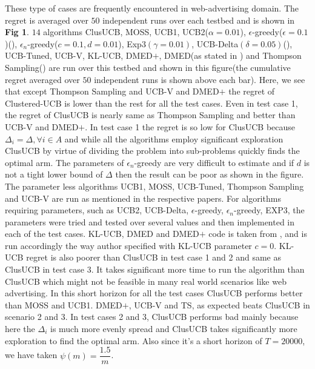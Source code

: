 	These type of cases are frequently encountered in web-advertising domain. The regret is averaged over $50$ independent runs over each testbed and is shown in \textbf{Fig 1}. $14$ algorithms ClusUCB, MOSS, UCB1, UCB2($\alpha=0.01$), $\epsilon$-greedy($\epsilon=0.1$)(\cite{sutton1998reinforcement}), $\epsilon_{n}$-greedy($c=0.1,d=0.01$), Exp3$(\gamma=0.01)$, UCB-Delta$(\delta=0.05)$(\cite{abbasi2011improved}), UCB-Tuned, UCB-V, KL-UCB, DMED$+$, DMED(as stated in \cite{garivier2011kl}) and Thompson Sampling(\cite{agrawal2011analysis}) are run over this testbed and shown in this figure(the cumulative regret averaged over $50$ independent runs is shown above each bar). Here, we see that except Thompson Sampling and UCB-V and DMED$+$ the regret of Clustered-UCB is lower than the rest for all the test cases. Even in test case 1, the regret of ClusUCB is nearly same as Thompson Sampling and better than UCB-V and DMED$+$. In test case 1 the regret is so low for ClusUCB because $\Delta_{i}=\Delta, \forall i\in A$ and while all the algorithms employ significant exploration ClusUCB by virtue of dividing the problem into sub-problems quickly finds the optimal arm. The parameters of $\epsilon_{n}$-greedy are very difficult to estimate and if $d$ is not a tight lower bound of $\Delta$ then the result can be poor as shown in the figure. The parameter less algorithms  UCB1, MOSS, UCB-Tuned, Thompson Sampling and UCB-V are run as mentioned in the respective papers. For algorithms requiring parameters, such as UCB2, UCB-Delta, $\epsilon$-greedy, $\epsilon_{n}$-greedy, EXP3, the parameters were tried and tested over several values and then implemented in each of the test cases. KL-UCB, DMED and DMED$+$ code is taken from \cite{CapGarKau12}, and is run accordingly the way author specified with KL-UCB parameter $c=0$.  KL-UCB regret is also poorer than ClusUCB in test case 1 and 2 and same as ClusUCB in test case 3. It takes significant more time to run the algorithm than ClusUCB which might not be feasible in many real world scenarios like web advertising. In this short horizon for all the test cases ClusUCB 
performs better than MOSS and UCB1. DMED$+$, UCB-V and TS, as expected beats ClusUCB in scenario 2 and 3. In test cases 2 and 3, ClusUCB performs bad mainly because here the $\Delta_{i}$ is much more evenly spread and ClusUCB takes significantly more exploration to find the optimal arm. Also since it's a short horizon of $T=20000$, we have taken $\psi(m)=\dfrac{1.5}{m}$.


